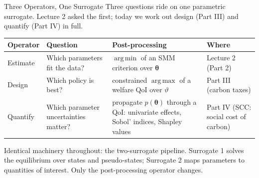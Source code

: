 \documentclass[aspectratio=169,11pt]{beamer}
\newcommand{\emphc}[1]{\textcolor{harvardcrimson}{#1}}
\DeclareMathOperator*{\argmin}{arg\,min}
\DeclareMathOperator*{\argmax}{arg\,max}
\begin{document}
\begin{frame}{Three Operators, One Surrogate}
\small
Three questions ride on one parametric surrogate. Lecture 2 asked the first; today we work out \emphc{design} (Part III) and \emphc{quantify} (Part IV) in full.
\vspace{0.5em}
\begin{center}
\footnotesize
\begin{tabular}{p{}p{}p{}p{}}
\toprule
\textbf{Operator} & \textbf{Question} & \textbf{Post-processing} & \textbf{Where} \\
\midrule
\emphc{Estimate} & Which parameters fit the data? & $\argmin$ of an SMM criterion over $\bm{\theta}$ & Lecture 2 (Part 2) \\[3pt]
\emphc{Design} & Which policy is best? & constrained $\argmax$ of a welfare QoI over $\vartheta$ & Part III (carbon taxes) \\[3pt]
\emphc{Quantify} & Which parameter uncertainties matter? & propagate $p(\bm{\theta})$ through a QoI: univariate effects, Sobol' indices, Shapley values & Part IV (SCC: social cost of carbon) \\
\bottomrule
\end{tabular}
\end{center}
\vspace{0.5em}
Identical machinery throughout: the \emphc{two-surrogate pipeline}. Surrogate 1 solves the equilibrium over states and pseudo-states; Surrogate 2 maps parameters to quantities of interest. Only the post-processing operator changes.
\end{frame}
\end{document}
